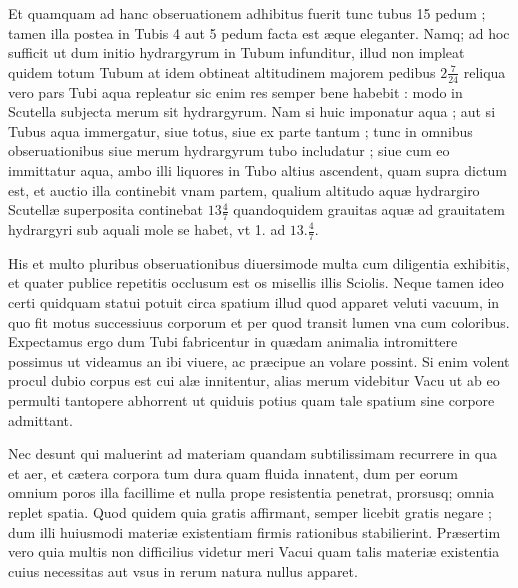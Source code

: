 \documentclass[11pt,a4paper]{article}
\begin{document}
Et quamquam ad hanc obseruationem adhibitus fuerit tunc tubus 15 pedum ; tamen illa postea in Tubis 4 aut 5 pedum facta est æque eleganter. Namq; ad hoc sufficit ut dum initio hydrargyrum in Tubum infunditur, illud non impleat quidem totum Tubum at idem obtineat altitudinem majorem pedibus $2\frac{7}{24}$ reliqua vero pars Tubi aqua repleatur sic enim res semper bene habebit : modo in Scutella subjecta merum sit hydrargyrum. Nam si huic imponatur aqua ; aut si Tubus aqua immergatur, siue totus, siue ex parte tantum ; tunc in omnibus obseruationibus siue merum hydrargyrum tubo includatur ; siue cum eo immittatur aqua, ambo illi liquores in Tubo altius ascendent, quam supra dictum est, et auctio illa continebit vnam partem, qualium altitudo aquæ hydrargiro Scutellæ superposita continebat $13\frac{4}{7}$ quandoquidem grauitas aquæ ad grauitatem hydrargyri sub aquali mole se habet, vt 1. ad $13.\frac{4}{7}$.

His et multo pluribus obseruationibus diuersimode multa cum diligentia exhibitis, et quater publice repetitis occlusum est os misellis illis Sciolis. Neque tamen ideo certi quidquam statui potuit circa spatium illud quod apparet veluti vacuum, in quo fit motus successiuus corporum et per quod transit lumen vna cum coloribus. Expectamus ergo dum Tubi fabricentur in   quædam animalia intromittere possimus ut videamus an ibi viuere, ac præcipue an volare possint. Si enim volent procul dubio corpus est cui alæ innitentur, alias merum videbitur Vacu\ill{} ut ab eo permulti tantopere abhorrent ut quiduis potius quam tale spatium sine corpore admittant.

Nec desunt qui maluerint ad materiam quandam subtilissimam recurrere in qua et aer, et cætera corpora tum dura quam fluida innatent, dum per eorum omnium poros illa facillime et nulla prope resistentia penetrat, prorsusq; omnia replet spatia. Quod quidem quia gratis affirmant, semper licebit gratis negare ; dum illi huiusmodi materiæ existentiam firmis rationibus stabilierint. Præsertim vero quia multis non difficilius videtur meri Vacui quam talis materiæ existentia cuius necessitas aut vsus in rerum natura nullus apparet.
\end{document}
